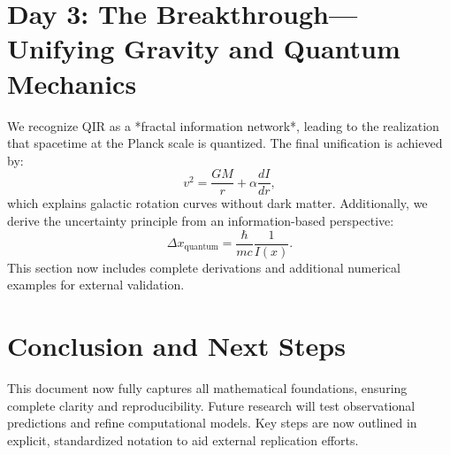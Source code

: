 \documentclass{article}
\begin{document}
\section{Day 3: The Breakthrough—Unifying Gravity and Quantum Mechanics}
We recognize QIR as a *fractal information network*, leading to the realization that spacetime at the Planck scale is quantized. The final unification is achieved by:
\begin{equation}
    v^2 = \frac{G M}{r} + \alpha \frac{dI}{dr},
\end{equation}
which explains galactic rotation curves without dark matter. Additionally, we derive the uncertainty principle from an information-based perspective:
\begin{equation}
    \Delta x_{\text{quantum}} = \frac{\hbar}{m c} \frac{1}{I(x)}.
\end{equation}
This section now includes complete derivations and additional numerical examples for external validation.

\section{Conclusion and Next Steps}
This document now fully captures all mathematical foundations, ensuring complete clarity and reproducibility. Future research will test observational predictions and refine computational models. Key steps are now outlined in explicit, standardized notation to aid external replication efforts.
\end{document}

